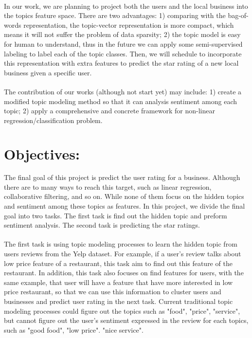 \documentclass{article}
\begin{document}
\paragraph{} In our work, we are planning to project both the users and the local business into the topics feature space. There are two advantages: 1) comparing with the bag-of-words representation, the topic-vector representation is more compact, which means it will not suffer the problem of data sparsity; 2) the topic model is easy for human to understand, thus in the future we can apply some semi-supervised labeling to label each of the topic classes. Then, we will schedule to incorporate this representation with extra features to predict the star rating of a new local business given a specific user.

\paragraph{} The contribution of our works (although not start yet) may include: 1) create a modified topic modeling method so that it can analysis sentiment among each topic; 2) apply a comprehensive and concrete framework for non-linear regression/classification problem.



\section*{Objectives:}
\paragraph{} The final goal of this project is predict the user rating for a business. Although there are to many ways to reach this target, such as linear regression, collaborative filtering, and so on. While none of them focus on the hidden topics and sentiment among these topics as features. In this project, we divide the final goal into two tasks. The first task is find out the hidden topic and preform sentiment analysis. The second task is predicting the star ratings.

\paragraph{} The first task is using topic modeling processes to learn the hidden topic from users reviews from the Yelp dataset. For example, if a user’s review talks about low price feature of a restaurant, this task aim to find out this feature of the restaurant. In addition, this task also focuses on find features for users, with the same example, that user will have a feature that have more interested in low price restaurant, so that we can use this information to cluster users and businesses and predict user rating in the next task. Current traditional topic modeling processes could figure out the topics such as "food", "price", "service", but cannot figure out the user’s sentiment expressed in the review for each topics, such as "good food", "low price". "nice service".
\end{document}
